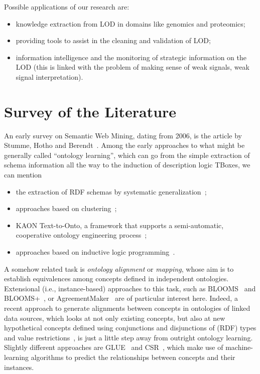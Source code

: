 \documentclass[a4paper]{article}
\newcounter{ex}
\begin{document}
Possible applications of our research are:
\begin{itemize}
\item knowledge extraction from LOD in domains like genomics and proteomics;
\item providing tools to assist in the cleaning and validation of LOD;
\item information intelligence and the monitoring of strategic information on the LOD
  (this is linked with the problem of making sense of weak signals,
  weak signal interpretation).
\end{itemize}

\section{Survey of the Literature}
\label{sec:survey}

An early survey on Semantic Web Mining, dating from 2006, is the article by
Stumme, Hotho and Berendt~\cite{StummeHothoBerendt2006}.
Among the early approaches to what might be generally called ``ontology learning'',
which can go from the simple extraction of schema information all the way to the
induction of description logic TBoxes, we can mention
\begin{itemize}
\item the extraction of RDF schemas by systematic generalization~\cite{DelteilFaronDieng2001};
\item approaches based on clustering~\cite{MaedcheZacharias2002};
\item KAON Text-to-Onto, a framework that supports a semi-automatic, cooperative
  ontology engineering process~\cite{MaedcheStaab2004};
\item approaches based on inductive logic programming~\cite{GrimnesEdwardsPreece2004,FanizziDAmatoEsposito2008,Lehmann2009,dAmatoFanizziEsposito2010swj}.
\end{itemize}

A somehow related task is \emph{ontology alignment} or \emph{mapping},
whose aim is to establish equivalences among concepts defined in independent ontologies.
Extensional (i.e., instance-based) approaches to this task, such as
BLOOMS~\cite{JainHitzlerShethVermaYeh2010}
and BLOOMS+~\cite{JainYehVermaVasquezDamovaHitzlerSheth2011},
or AgreementMaker~\cite{CruzPalmonariCaimiStroe2013}
are of particular interest here.
Indeed, a recent approach to generate alignments between concepts
in ontologies of linked data sources, which looks at not only existing concepts,
but also at new hypothetical concepts defined using conjunctions and
disjunctions of (RDF) types and value restrictions~\cite{ParundekarKnoblockAmbite2012},
is just a little step away from outright ontology learning.
Slightly different approaches are
GLUE~\cite{DoanMadhavanDomingosHalevy2004}
and CSR~\cite{SpiliopoulosValarakosVouros2008},
which make use of machine-learning algorithms to predict the relationships
between concepts and their instances.
\end{document}
